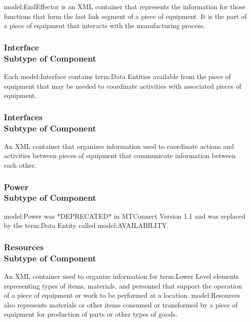 \FloatBarrier

{model:EndEffector} is an XML container that represents the information for those functions that form the last link segment of a piece of equipment. It is the part of a piece of equipment that interacts with the manufacturing process.

\FloatBarrier
\subsubsection[Interface]{Interface \\ {\small Subtype of Component}}
  \label{type:Interface}

\FloatBarrier

Each {model:Interface} contains {term:Data Entities} available from the piece of equipment that may be needed to coordinate activities with associated pieces of equipment.

\FloatBarrier
\subsubsection[Interfaces]{Interfaces \\ {\small Subtype of Component}}
  \label{type:Interfaces}

\FloatBarrier

An XML container that organizes information used to coordinate actions and activities between pieces of equipment that communicate information between each other.

\FloatBarrier
\subsubsection[Power]{Power \\ {\small Subtype of Component}}
  \label{type:Power}

\FloatBarrier

{model:Power} was *DEPRECATED* in MTConnect Version 1.1 and was replaced by the {term:Data Entity} called {model:AVAILABILITY}.

\FloatBarrier
\subsubsection[Resources]{Resources \\ {\small Subtype of Component}}
  \label{type:Resources}

\FloatBarrier

An XML container used to organize information for {term:Lower Level} elements representing types of items, materials, and personnel that support the operation of a piece of equipment or work to be performed at a location. {model:Resources} also represents materials or other items consumed or transformed by a piece of equipment for production of parts or other types of goods.

